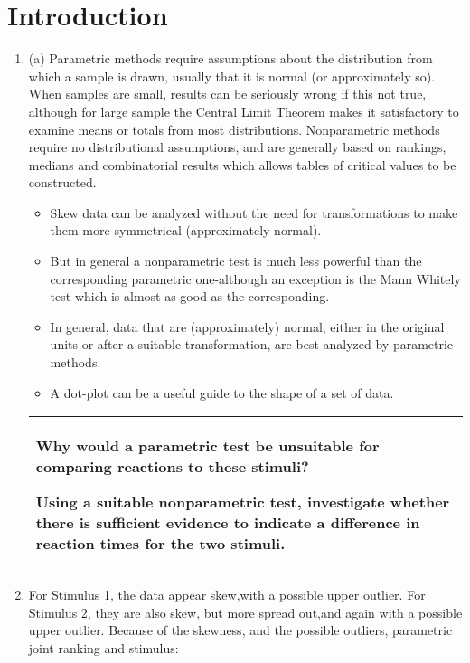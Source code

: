 \documentclass[a4paper,12pt]{article}
\begin{document}
\section{Introduction}
\begin{enumerate}
    \item (a) Parametric methods require assumptions about the distribution from which a sample is
drawn, usually that it is normal (or approximately so). When samples are small, results
can be seriously wrong if this not true, although for large sample the Central Limit
Theorem makes it satisfactory to examine means or totals from most distributions.
Nonparametric methods require no distributional assumptions, and are generally based
on rankings, medians and combinatorial results which allows tables of critical values to be constructed.
\begin{itemize}
    \item  Skew data can be analyzed without the need for transformations to make
them more symmetrical (approximately normal). 
\item But in general a nonparametric test is
much less powerful than the corresponding parametric one-although an exception is the
Mann Whitely test which is almost as good as the corresponding.
\item In general, data that are (approximately) normal, either in the original units or after a
suitable transformation, are best analyzed by parametric methods. 
\item A dot-plot can be a
useful guide to the shape of a set of data.
\end{itemize}
 \begin{table}[ht!]
 
\centering
 
\begin{tabular}{|p{15cm}|}
 
\hline
Why would a parametric test be unsuitable for comparing reactions to these stimuli?  
 
Using a suitable nonparametric test, investigate whether there is sufficient evidence to indicate a difference in reaction times for the two stimuli.  
 

\\ \hline
  
\end{tabular}

\end{table}
\item For Stimulus 1, the data appear skew,with a possible upper outlier. For Stimulus 2, they
are also skew, but more spread out,and again with a possible upper outlier.
Because of the skewness, and the possible outliers, parametric joint ranking and stimulus:


\end{enumerate}
\end{document}
